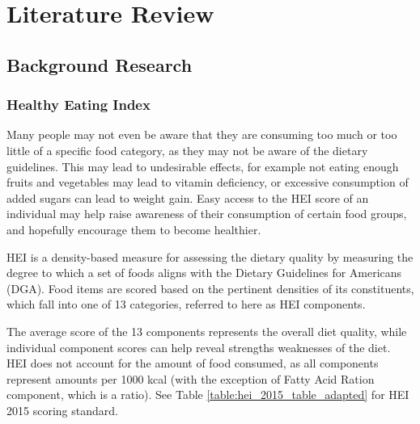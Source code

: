 \documentclass{article}
\begin{document}
\newpage
\section{Literature Review}
\subsection{Background Research}
\subsubsection{Healthy Eating Index}
Many people may not even be aware that they are consuming too much or too little of a specific food category, as they may not be aware of the dietary guidelines. This may lead to undesirable effects, for example not eating enough fruits and vegetables may lead to vitamin deficiency, or excessive consumption of added sugars can lead to weight gain. Easy access to the HEI score of an individual may help raise awareness of their consumption of certain food groups, and hopefully encourage them to become healthier. 
\bigskip

\noindent HEI \cite{hei_2015} is a density-based measure for assessing the dietary quality by measuring the degree to which a set of foods aligns with the Dietary Guidelines for Americans (DGA). Food items are scored based on the pertinent densities of its constituents, which fall into one of 13 categories, referred to here as HEI components. 

\bigskip
\noindent The average score of the 13 components represents the overall diet quality, while individual component scores can help reveal strengths weaknesses of the diet. HEI does not account for the amount of food consumed, as all components represent amounts per 1000 kcal (with the exception of Fatty Acid Ration component, which is a ratio). See Table \ref{table:hei_2015_table_adapted} for HEI 2015 scoring standard.
\end{document}
